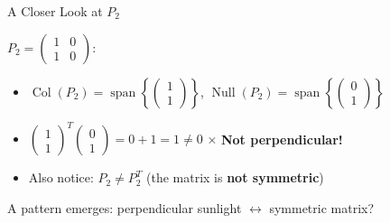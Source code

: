 \documentclass[10pt]{beamer}
\theoremstyle{definition}
\newcommand{\x}[1]{\alert{\textbf{#1}}}
\begin{document}
\begin{frame}{A Closer Look at $P_2$}

$P_2 = \begin{pmatrix} 1 & 0 \\ 1 & 0 \end{pmatrix}$:

\vspace{0.3em}

\begin{itemize}
\item $\operatorname{Col}(P_2) = \operatorname{span}\left\{\begin{pmatrix} 1 \\ 1 \end{pmatrix}\right\}$, \quad $\operatorname{Null}(P_2) = \operatorname{span}\left\{\begin{pmatrix} 0 \\ 1 \end{pmatrix}\right\}$

\vspace{0.3em}

\item $\begin{pmatrix} 1 \\ 1 \end{pmatrix}^T \begin{pmatrix} 0 \\ 1 \end{pmatrix} = 0 + 1 = 1 \neq 0$ $\times$ \quad \x{Not perpendicular!}

\vspace{0.3em}

\item Also notice: $P_2 \neq P_2^T$ \quad (the matrix is \x{not symmetric})
\end{itemize}

\vspace{1em}

A pattern emerges: perpendicular sunlight $\leftrightarrow$ symmetric matrix?

\end{frame}
\end{document}
